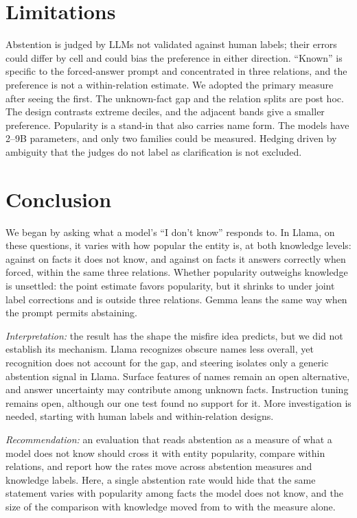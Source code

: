 \documentclass[manuscript,screen,review,anonymous,nonacm]{acmart}
\newcommand{\idk}{``I don't know''}
\begin{document}
\section{Limitations}
\label{sec:limits}

Abstention is judged by LLMs not validated against human labels; their errors could differ by cell and could bias the preference in either direction. ``Known'' is specific to the forced-answer prompt and concentrated in three relations, and the preference is not a within-relation estimate. We adopted the primary measure after seeing the first. The unknown-fact gap and the relation splits are post hoc. The design contrasts extreme deciles, and the adjacent bands give a smaller preference. Popularity is a stand-in that also carries name form. The models have 2--9B parameters, and only two families could be measured. Hedging driven by ambiguity that the judges do not label as clarification is not excluded.

\section{Conclusion}

We began by asking what a model's \idk{} responds to. In Llama, on these questions, it varies with how popular the entity is, at both knowledge levels: \tcObsUnkAbs{} against \tcPopUnkAbs{} on facts it does not know, and \msInKnownRate{} against \msKnownPopRate{} on facts it answers correctly when forced, within the same three relations. Whether popularity outweighs knowledge is unsettled: the point estimate favors popularity, but it shrinks to \rcJoint{} \rcJointCI{} under joint label corrections and is \msOutDiff{} outside three relations. Gemma leans the same way when the prompt permits abstaining.

\emph{Interpretation:} the result has the shape the misfire idea predicts, but we did not establish its mechanism. Llama recognizes obscure names less overall, yet recognition does not account for the gap, and steering isolates only a generic abstention signal in Llama. Surface features of names remain an open alternative, and answer uncertainty may contribute among unknown facts. Instruction tuning remains open, although our one test found no support for it. More investigation is needed, starting with human labels and within-relation designs.

\emph{Recommendation:} an evaluation that reads abstention as a measure of what a model does not know should cross it with entity popularity, compare within relations, and report how the rates move across abstention measures and knowledge labels. Here, a single abstention rate would hide that the same statement varies with popularity among facts the model does not know, and the size of the comparison with knowledge moved from \hjLlamaDiff{} to \faLlamaRegexDiff{} with the measure alone.
\end{document}
